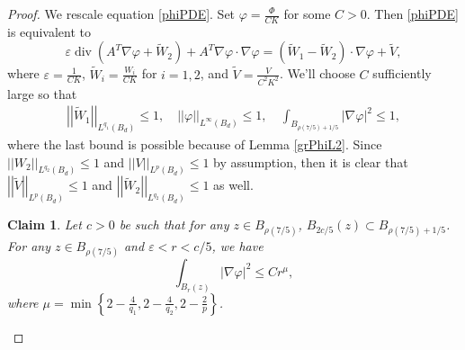 \documentclass[12pt,reqno]{amsart}
\theoremstyle{plain}
\newtheorem{clm}{Claim}
\theoremstyle{definition}
\DeclareMathOperator{\di}{div}
\newcommand{\eps}{\varepsilon}
\newcommand{\vp}{\varphi}
\newcommand{\iny}{\infty}
\newcommand{\su}{\subset}
\newcommand{\gr}{\nabla}
\newcommand{\norm}[1]{\left\vert \left\vert #1\right\vert\right\vert}
\newcommand{\abs}[1]{\left\vert#1\right\vert}
\newcommand{\set}[1]{\left\{#1\right\}}
\newcommand{\pr}[1]{\left( #1 \right) }
\begin{document}
\begin{proof}
We rescale equation \eqref{phiPDE}.
Set $\vp = \frac{\Phi}{C K}$ for some $C > 0$.
Then \eqref{phiPDE} is equivalent to 
\begin{equation}
\eps \di\pr{A^T \gr\vp + \widetilde W_2} + A^T \gr \vp \cdot \gr \vp = \pr{\widetilde W_1 - \widetilde W_2} \cdot \gr \vp + \widetilde V,
\label{vpPDE}
\end{equation}
where $\eps = \frac{1}{C K}$, $\widetilde W_i = \frac{W_i}{C K}$ for $i = 1, 2$, and $\widetilde V = \frac{V}{C^2 K^2}$.
We'll choose $C$ sufficiently large so that
\begin{align}
\norm{\widetilde W_1}_{L^{q_1}\pr{B_d}} \le 1, \quad 
\norm{\vp}_{L^\iny\pr{B_d}} \le 1, \quad 
\int_{B_{\rho\pr{7/5}+1/5}} \abs{\gr \vp}^2 \le 1,
\label{scaleBds}
\end{align}
where the last bound is possible because of Lemma \ref{grPhiL2}.
Since $\norm{W_2}_{L^{q_2}\pr{B_d}} \le 1$ and $\norm{V}_{L^p\pr{B_d}} \le 1$ by assumption, then it is clear that $\norm{\widetilde V}_{L^p\pr{B_d}} \le 1$ and $\norm{\widetilde W_2}_{L^{q_2}\pr{B_d}} \le 1$ as well.

\begin{clm}
Let $c> 0$ be such that for any $z \in B_{\rho\pr{7/5}}$, $B_{2c/5}\pr{z} \su B_{\rho\pr{7/5}+1/5}$.
For any $z \in B_{\rho\pr{7/5}}$ and $\eps < r < c/5$, we have
$$\int_{B_r\pr{z}} \abs{\gr \vp}^2 \le C r^\mu,$$
where $\mu = \min\set{2 - \frac 4 {q_1}, 2 - \frac 4 {q_2}, 2 - \frac 2 p}$.
\label{clm1}
\end{clm}


\end{proof}
\end{document}
